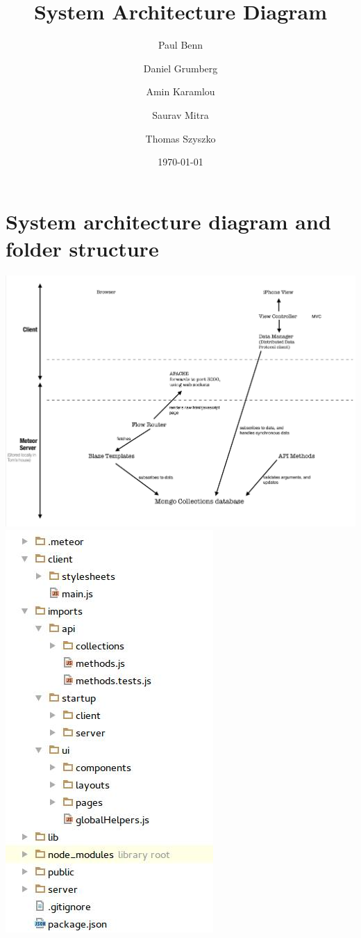 \documentclass[a4wide, 11pt]{article}
\begin{document}
\title{System Architecture Diagram}

\author{Paul Benn \and Daniel Grumberg \and Amin Karamlou \and Saurav Mitra \and Thomas Szyszko }

\date{\today}


\clearpage

\section{System architecture diagram and folder structure}

\includegraphics[scale=0.2]{system_arch_diagram}\\
\includegraphics[scale=0.3]{folder_structure}
\end{document}
